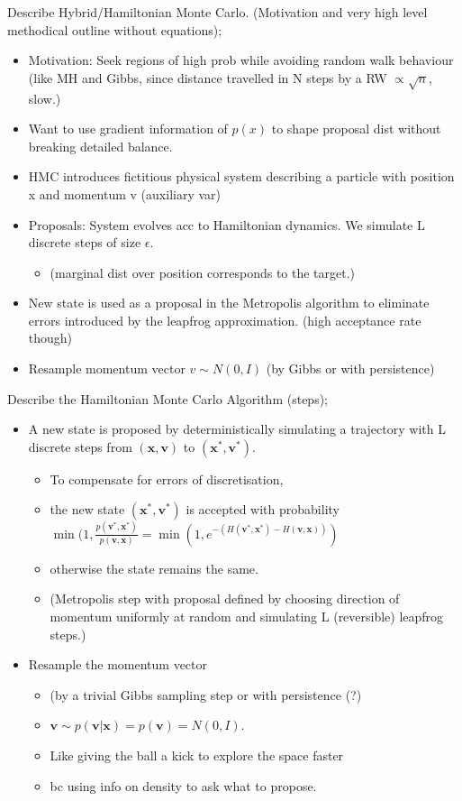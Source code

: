 \documentclass{article}
\begin{document}
Describe Hybrid/Hamiltonian Monte Carlo. (Motivation and very high level methodical outline without equations); \begin{itemize} \item Motivation: Seek regions of high prob while avoiding random walk behaviour (like MH and Gibbs, since distance travelled in N steps by a RW $\propto \sqrt{n}$, slow.) \item Want to use gradient information of $p(x)$ to shape proposal dist without breaking detailed balance. \item HMC introduces fictitious physical system describing a particle with position x and momentum v (auxiliary var) \item Proposals: System evolves acc to Hamiltonian dynamics. We simulate L discrete steps of size $\epsilon$. \begin{itemize} \item (marginal dist over position corresponds to the target.) \end{itemize}  \item New state is used as a proposal in the Metropolis algorithm to eliminate errors introduced by the leapfrog approximation. (high acceptance rate though) \item Resample momentum vector $v\sim N(0,I)$ (by Gibbs or with persistence) \end{itemize}


Describe the Hamiltonian Monte Carlo Algorithm (steps); \begin{itemize} \item A new state is proposed by deterministically simulating a trajectory with L discrete steps from $(\mathbf{x, v})$ to $(\mathbf{x^*, v^*})$. \begin{itemize} \item To compensate for errors of discretisation,  \item the new state $(\mathbf{x^*, v^*})$ is accepted with probability $\min (1, \frac{p(\mathbf{v^*, x^*})}{p(\mathbf{v, x})}=\min(1, e^{-(H(\mathbf{v^*, x^*})-H(\mathbf{v, x}))})$ \item otherwise the state remains the same.  \item (Metropolis step with proposal defined by choosing direction of momentum uniformly at random and simulating L (reversible) leapfrog steps.)  \end{itemize} \item Resample the momentum vector \begin{itemize} \item (by a trivial Gibbs sampling step or with persistence (?) \item $\mathbf{v}\sim p(\mathbf{v|x}) = p(\mathbf{v}) = N(0,I)$. \item Like giving the ball a kick to explore the space faster \item bc using info on density to ask what to propose. \end{itemize} \end{itemize}
\end{document}
